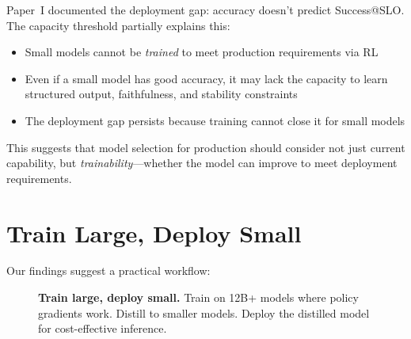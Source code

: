\documentclass[11pt]{article}
\begin{document}
Paper~I documented the deployment gap: accuracy doesn't predict Success@SLO.
The capacity threshold partially explains this:

\begin{itemize}[leftmargin=12pt]
    \item Small models cannot be \emph{trained} to meet production requirements via RL
    \item Even if a small model has good accuracy, it may lack the capacity to learn structured output, faithfulness, and stability constraints
    \item The deployment gap persists because training cannot close it for small models
\end{itemize}

This suggests that model selection for production should consider not just current capability, but \emph{trainability}---whether the model can improve to meet deployment requirements.

\section{Train Large, Deploy Small}

Our findings suggest a practical workflow:

\begin{figure}[t]
\centering
{}
\caption{\textbf{Train large, deploy small.} Train on 12B+ models where policy gradients work. Distill to smaller models. Deploy the distilled model for cost-effective inference.}
\label{fig:pipeline}
\end{figure}
\end{document}
